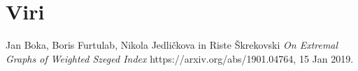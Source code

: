 \documentclass[12pt, a4paper]{article}
\begin{document}
\newpage
\section[Viri]{Viri}

\begin{thebibliography}{9}
Jan Boka, Boris Furtulab, Nikola Jedličkova in Riste Škrekovski
\textit{On Extremal Graphs of Weighted Szeged Index} 
https://arxiv.org/abs/1901.04764, 15 Jan 2019.
 

\end{thebibliography}
\end{document}
